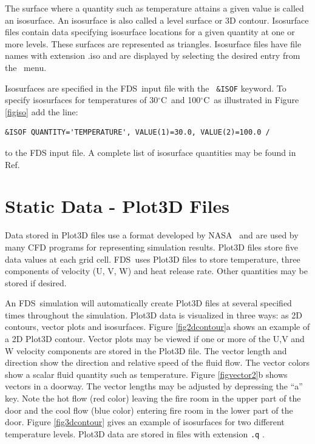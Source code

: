 \documentclass[11pt,twoside]{book}
\newcommand{\degC}{$^\circ$C}
\newcommand{\FDS}{{FDS}}
\newcommand{\fds}{{FDS}}
\newcommand{\loadmenu}{\fbox{\tt Load/Unload} }
\begin{document}
The surface where a quantity such as temperature attains a given
value is called an isosurface. An isosurface is also called a
level surface or 3D contour. Isosurface files contain data
specifying isosurface locations for a given quantity at one or
more levels. These surfaces are represented as triangles.
Isosurface files have file names with extension .iso and are
displayed by selecting the desired entry from the \loadmenu\ menu.

Isosurfaces are specified in the \fds\ input file with the {\tt
\&ISOF} keyword.  To specify isosurfaces for temperatures of
30\degC\ and 100\degC\ as illustrated in Figure \ref{figiso} add
the line:
\begin{verbatim}
&ISOF QUANTITY='TEMPERATURE', VALUE(1)=30.0, VALUE(2)=100.0 /
\end{verbatim}
to the FDS input file.  A complete list of isosurface quantities may be
found in Ref.~\cite{FDS_Users_Guide_5}

\section{Static Data - Plot3D Files} Data stored in Plot3D files
use a format developed by NASA~\cite{PLOT3D} and are used by many
CFD programs for representing simulation results. Plot3D files
store five data values at each grid cell. \FDS\ uses Plot3D files
to store temperature, three components of velocity (U, V, W) and
heat release rate. Other quantities may be stored if desired.

An \fds\ simulation will automatically  create Plot3D files at several
specified times throughout the simulation. Plot3D data is
visualized in three ways: as 2D contours, vector plots and
isosurfaces. Figure \ref{fig2dcontour}a shows an example of a 2D
Plot3D contour. Vector plots may be viewed if one or more of the
U,V and W velocity components are stored in the Plot3D file. The
vector length and direction show the direction and relative speed
of the fluid flow. The vector colors show a scalar fluid quantity
such as temperature. Figure \ref{figvector2}b shows vectors in a
doorway. The vector lengths may be adjusted by depressing the
``a'' key.  Note the hot flow (red color) leaving the fire room in
the upper part of the door and the cool flow (blue color) entering
fire room in the lower part of the door. Figure \ref{fig3dcontour}
gives an example of isosurfaces for two different temperature
levels. Plot3D data are stored in files with extension {\tt .q} .
\end{document}
